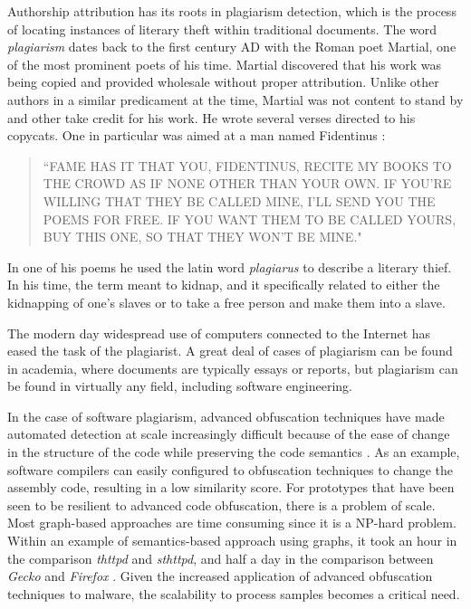 \documentclass[12pt]{report}
\begin{document}
Authorship attribution has its roots in plagiarism detection, which is the process of locating instances of literary theft within traditional documents.  The word \emph{plagiarism} dates back to the first century AD with the Roman poet Martial, one of the most prominent poets of his time.  Martial discovered that his work was being copied and provided wholesale without proper attribution.  Unlike other authors in a similar predicament at the time, Martial was not content to stand by and other take credit for his work.  He wrote several verses directed to his copycats.  One in particular was aimed at a man named Fidentinus \cite{martial:1958}:

\begin{quote}
``FAME HAS IT THAT YOU, FIDENTINUS, RECITE MY BOOKS TO THE CROWD AS IF NONE OTHER THAN YOUR OWN.
IF YOU’RE WILLING THAT THEY BE CALLED MINE, I’LL SEND YOU THE POEMS FOR FREE.
IF YOU WANT THEM TO BE CALLED YOURS, BUY THIS ONE, SO THAT THEY WON’T BE MINE." 
\end{quote}

In one of his poems he used the latin word \emph{plagiarus} to describe a literary thief.  In his time, the term meant to kidnap, and it specifically related to either the kidnapping of one's slaves or to take a free person and make them into a slave.

The modern day widespread use of computers connected to the Internet has eased the task of the plagiarist.  A great deal of cases of plagiarism can be found in academia, where documents are typically essays or reports, but plagiarism can be found in virtually any field, including software engineering. \cite{!stealsc:2012}

In the case of software plagiarism, advanced obfuscation techniques have made automated detection at scale increasingly difficult because of the ease of change in the structure of the code while preserving the code semantics \cite{xu2020revisiting}.  As an example, software compilers can easily configured to obfuscation techniques to change the assembly code, resulting in a low similarity score.  For prototypes that have been seen to be resilient to advanced code obfuscation, there is a problem of scale.  Most graph-based approaches are time consuming since it is a NP-hard problem.  Within an example of semantics-based approach using graphs, it took an hour in  the  comparison \emph{thttpd} and \emph{sthttpd}, and half a day in the comparison between \emph{Gecko} and \emph{Firefox} \cite{luo2014semantics}.  Given the increased application of advanced obfuscation techniques to malware, the scalability to process samples becomes a critical need.
\end{document}
